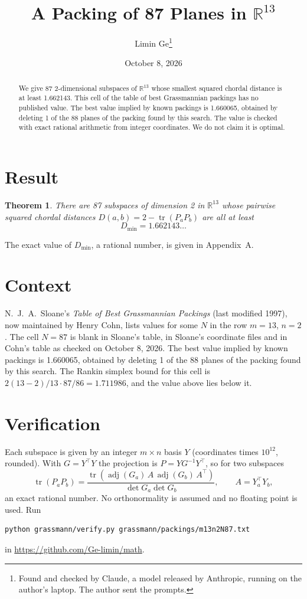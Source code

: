 \documentclass[11pt,a4paper]{article}
\title{A Packing of 87 Planes in $\mathbb{R}^{13}$}
\author{Limin Ge\thanks{Found and checked by Claude, a model released by Anthropic, running on the author's laptop. The author sent the prompts.}}
\date{October 8, 2026}
\newtheorem*{theorem}{Theorem}
\begin{document}
\maketitle
\begin{abstract}
We give 87 2-dimensional subspaces of $\mathbb{R}^{13}$ whose smallest squared chordal distance is at least 1.662143. This cell of the table of best Grassmannian packings has no published value. The best value implied by known packings is 1.660065, obtained by deleting 1 of the 88 planes of the packing found by this search. The value is checked with exact rational arithmetic from integer coordinates. We do not claim it is optimal.
\end{abstract}

\section{Result}
\begin{theorem}
There are 87 subspaces of dimension 2 in $\mathbb{R}^{13}$ whose pairwise squared chordal distances $D(a,b) = 2 - \operatorname{tr}(P_aP_b)$ are all at least
\[ D_{\min} = 1.662143\ldots \]
\end{theorem}
The exact value of $D_{\min}$, a rational number, is given in Appendix~A.


\section{Context}
N.~J.~A.~Sloane's \emph{Table of Best Grassmannian Packings} (last modified 1997), now maintained by Henry Cohn, lists values for some $N$ in the row $m=13$, $n=2$. The cell $N=87$ is blank in Sloane's table, in Sloane's coordinate files and in Cohn's table as checked on October 8, 2026. The best value implied by known packings is 1.660065, obtained by deleting 1 of the 88 planes of the packing found by this search. The Rankin simplex bound for this cell is $2(13-2)/13\cdot 87/86 = 1.711986$, and the value above lies below it.


\section{Verification}
Each subspace is given by an integer $m\times n$ basis $Y$ (coordinates times $10^{12}$, rounded). With $G=Y^\top Y$ the projection is $P=YG^{-1}Y^\top$, so for two subspaces
\[ \operatorname{tr}(P_aP_b)=\frac{\operatorname{tr}(\operatorname{adj}(G_a)\,A\,\operatorname{adj}(G_b)\,A^\top)}{\det G_a\det G_b},\qquad A=Y_a^\top Y_b, \]
an exact rational number. No orthonormality is assumed and no floating point is used. Run
\begin{verbatim}
python grassmann/verify.py grassmann/packings/m13n2N87.txt
\end{verbatim}
in \url{https://github.com/Ge-limin/math}.
\end{document}
